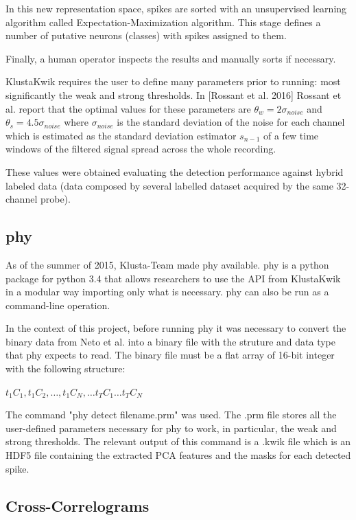 \documentclass{article}
\begin{document}
In this new representation space, spikes are sorted with an unsupervised learning algorithm called Expectation-Maximization algorithm. This stage defines a number of putative neurons (classes) with spikes assigned to them.

Finally, a human operator inspects the results and manually sorts if necessary.

KlustaKwik requires the user to define many parameters prior to running: most significantly the  weak and strong thresholds. In [Rossant et al. 2016] Rossant et al. report that the optimal values for these parameters are $\theta_w = 2 \sigma_{noise}$ and $\theta_s = 4.5 \sigma_{noise}$ where $\sigma_{noise}$ is the standard deviation of the noise for each channel which is estimated as the standard deviation estimator $s_{n-1}$ of a few time windows of the filtered signal spread across the whole recording.

These values were obtained evaluating the detection performance against hybrid labeled data (data composed by several labelled dataset acquired by the same 32-channel probe). 

\subsection{phy}
\label{subsec:phy}
As of the summer of 2015, Klusta-Team made phy available. phy is a python package for python 3.4 that allows researchers to use the API from KlustaKwik in a modular way importing only what is necessary. phy can also be run as a command-line operation.

In the context of this project, before running phy it was necessary to convert the binary data from Neto et al. into a binary file with the struture and data type that phy expects to read. The binary file must be a flat array of 16-bit integer with the following structure:

$t_1C_1 , t_1C_2, \ldots , t_1C_N, \ldots t_TC_1 \ldots t_TC_N$ %

The command "phy detect filename.prm" was used. The .prm file stores all the user-defined parameters necessary for phy to work, in particular, the weak and strong thresholds. The relevant output of this command is a .kwik file which is an HDF5 file containing the extracted PCA features and the masks for each detected spike.

\subsection{Cross-Correlograms}
\label{subsec:CC}
\end{document}

